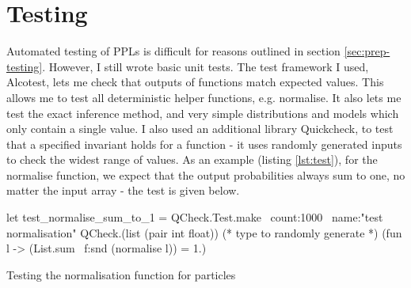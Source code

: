 	
\section{Testing}
	
Automated testing of PPLs is difficult for reasons outlined in section \ref{sec:prep-testing}. However, I still wrote basic unit tests. The test framework I used, Alcotest, lets me check that outputs of functions match expected values. This allows me to test all deterministic helper functions, e.g. normalise. It also lets me test the exact inference method, and very simple distributions and models which only contain a single value. I also used an additional library Quickcheck, to test that a specified invariant holds for a function - it uses randomly generated inputs to check the widest range of values. As an example (listing \ref{lst:test}), for the normalise function, we expect that the output probabilities always sum to one, no matter the input array - the test is given below.
	
	
\begin{listing}[!htb]
	\centering
	\begin{ocamlcode-in} 
let test_normalise_sum_to_1 =
QCheck.Test.make ~count:1000 ~name:"test normalisation"
QCheck.(list (pair int float)) (* type to randomly generate *)
(fun l -> (List.sum ~f:snd (normalise l)) = 1.)
	\end{ocamlcode-in}
	\caption{Testing the normalisation function for particles}
	\label{lst:test}
\end{listing}
	

